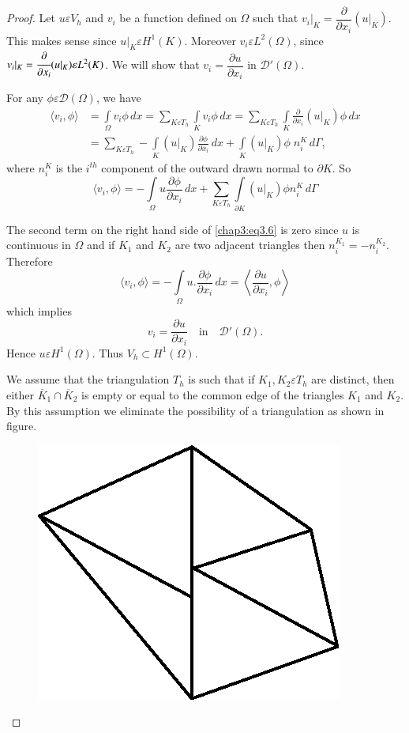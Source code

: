 \begin{proof}
Let $u\varepsilon V_h$ and $v_i$ be a function defined on $\Omega$
such that $v_i|_K=\dfrac{\partial}{\partial x_i}(u|_K)$. This makes
sense since $u|_K\varepsilon H^1(K)$. Moreover $v_i\varepsilon
L^2(\Omega)$, since $v_i|_K=\cfrac{\partial}{\partial x_i}(u|_K)
\varepsilon L^2(K)$. We will show that $v_i=\dfrac{\partial u}
{\partial x_i}$ in $\mathscr{D}'(\Omega)$.

For any $\phi\varepsilon\mathscr{D}(\Omega)$, we have 
\begin{align*}
\langle v_i,\phi\rangle &= \int\limits_\Omega v_i\phi\,dx= \sum\limits_{K\varepsilon
T_h}\int\limits_K v_i\phi\,dx= \sum\limits_{K\varepsilon T_h}
\int\limits_K\frac{\partial}{\partial x_i}(u|_K)\phi\,dx\\
&= \sum\limits_{K\varepsilon T_h}-\int\limits_K(u|_K)
\frac{\partial\phi}{\partial x_i}\,dx+\int\limits_K(u|_K)\phi\; n_i^K \,
d\Gamma, 
\end{align*}\pageoriginale
where $n_i^K$ is the $i^{th}$ component of the outward drawn normal to
$\partial K$. So
\begin{equation}\label{chap3:eq3.6}
\langle v_i,\phi\rangle=-\int\limits_\Omega u\frac{\partial\phi} {\partial x_i}
\,dx+\sum\limits_{K\varepsilon T_h}\int\limits_{\partial K}(u|_K)\phi
n_i^K \,d\Gamma
\end{equation}

The second term on the right hand side of \eqref{chap3:eq3.6} is zero
since $u$ is continuous in $\Omega$ and if $K_1$ and $K_2$ are two
adjacent triangles then $n_i^{K_1}=-n_i^{K_2}$. Therefore
$$
\langle v_i, \phi\rangle=-\int\limits_\Omega u.\frac{\partial\phi}{\partial x_i}\,dx
=\left\langle\frac{\partial u}{\partial x_i},\phi \right\rangle
$$
which implies
$$
v_i=\frac{\partial u}{\partial x_i}\quad\text{in}\quad\mathscr{D}'
(\Omega). 
$$
Hence $u\varepsilon H^1(\Omega)$. Thus $V_h\subset H^1(\Omega)$. 

We assume that the triangulation $T_h$ is such that if $K_1, K_2
\varepsilon T_h$ are distinct, then either $\overline{K}_1\cap
\overline{K}_2$ is empty or equal to the common edge of the triangles
$K_1$ and $K_2$. By this assumption we eliminate the possibility of
a triangulation as shown in figure.
\begin{figure}[H]
\centering
\includegraphics{figure/fig3.1.eps}
\caption{}\label{fig3.1}
\end{figure}


\end{proof}
